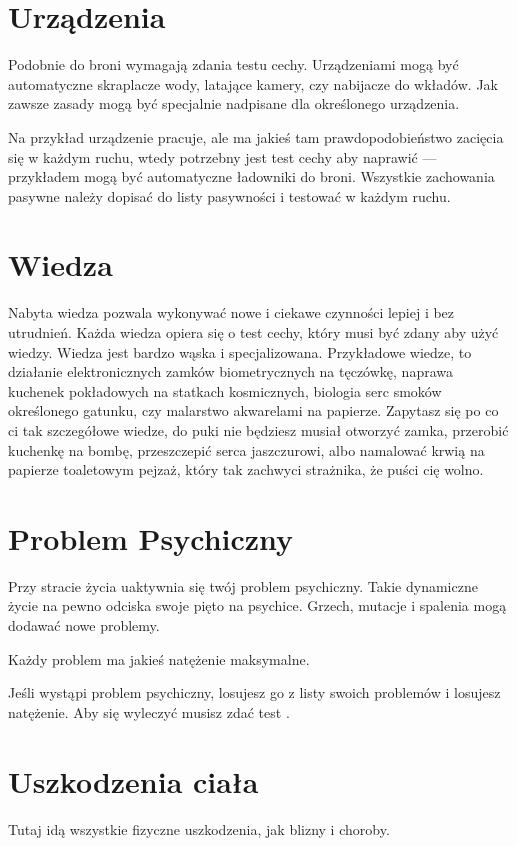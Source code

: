 \section{Urządzenia}
Podobnie do broni wymagają zdania testu cechy.
Urządzeniami mogą być automatyczne skraplacze wody, latające kamery, czy nabijacze do wkładów.
Jak zawsze zasady mogą być specjalnie nadpisane dla określonego urządzenia.

Na przykład urządzenie pracuje, ale ma jakieś tam prawdopodobieństwo zacięcia się w każdym ruchu, wtedy potrzebny jest test cechy aby naprawić --- przykładem mogą być automatyczne ładowniki do broni.
Wszystkie zachowania pasywne należy dopisać do listy pasywności i testować w każdym ruchu.

\section{Wiedza}
Nabyta wiedza pozwala wykonywać nowe i ciekawe czynności lepiej i bez utrudnień.
Każda wiedza opiera się o test cechy, który musi być zdany aby użyć wiedzy.
Wiedza jest bardzo wąska i specjalizowana.
Przykładowe wiedze, to działanie elektronicznych zamków biometrycznych na tęczówkę, naprawa kuchenek pokładowych na statkach kosmicznych, biologia serc smoków określonego gatunku, czy malarstwo akwarelami na papierze.
Zapytasz się po co ci tak szczegółowe wiedze, do puki nie będziesz musiał otworzyć zamka, przerobić kuchenkę na bombę, przeszczepić serca jaszczurowi, albo namalować krwią na papierze toaletowym pejzaż, który tak zachwyci strażnika, że puści cię wolno.

\section{Problem Psychiczny}
Przy stracie życia uaktywnia się twój problem psychiczny.
Takie dynamiczne życie na pewno odciska swoje pięto na psychice. 
Grzech, mutacje i spalenia mogą dodawać nowe problemy.

Każdy problem ma jakieś natężenie maksymalne.

Jeśli wystąpi problem psychiczny, losujesz go z listy swoich problemów i losujesz natężenie.
Aby się wyleczyć musisz zdać test \abh{}.

\section{Uszkodzenia ciała}
Tutaj idą wszystkie fizyczne uszkodzenia, jak blizny i choroby.

